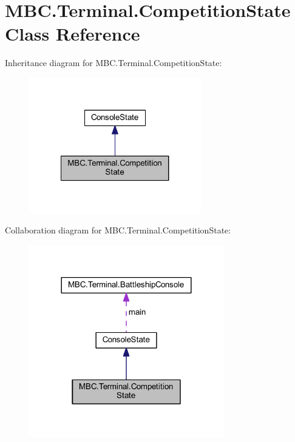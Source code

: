 \hypertarget{class_m_b_c_1_1_terminal_1_1_competition_state}{\section{M\-B\-C.\-Terminal.\-Competition\-State Class Reference}
\label{class_m_b_c_1_1_terminal_1_1_competition_state}
}


Inheritance diagram for M\-B\-C.\-Terminal.\-Competition\-State\-:\nopagebreak
\begin{figure}[H]
\begin{center}
\leavevmode
\includegraphics[width=212pt]{class_m_b_c_1_1_terminal_1_1_competition_state__inherit__graph}
\end{center}
\end{figure}


Collaboration diagram for M\-B\-C.\-Terminal.\-Competition\-State\-:\nopagebreak
\begin{figure}[H]
\begin{center}
\leavevmode
\includegraphics[width=240pt]{class_m_b_c_1_1_terminal_1_1_competition_state__coll__graph}
\end{center}
\end{figure}
